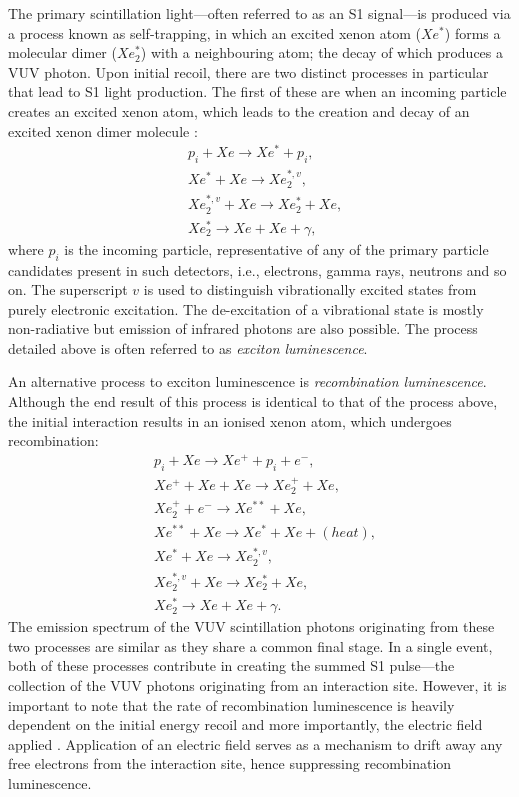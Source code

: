 The primary scintillation light---often referred to as an S1 signal---is produced via a process known as self-trapping, in which an excited xenon atom ($Xe^{\ast}$) forms a molecular dimer ($Xe^{\ast}_{2}$) with a neighbouring atom; the decay of which produces a VUV photon. Upon initial recoil, there are two distinct processes in particular that lead to S1 light production. The first of these are when an incoming particle creates an excited xenon atom, which leads to the creation and decay of an excited xenon dimer molecule \cite{xenon_physics}:
%
\begin{align} \label{eq:exciton_luminescence}
    &p_{i} + Xe \rightarrow Xe^{\ast} + p_{i}, \\
    &Xe^{\ast} + Xe \rightarrow Xe^{\ast, v}_{2}, \\
    &Xe^{\ast, v}_{2} + Xe \rightarrow Xe^{\ast}_{2} + Xe, \\
    &Xe^{\ast}_{2} \rightarrow  Xe +  Xe + \gamma,
\end{align}
%
where $p_{i}$ is the incoming particle, representative of any of the primary particle candidates present in such detectors, i.e., electrons, gamma rays, neutrons and so on. The superscript $v$ is used to distinguish vibrationally excited states from purely electronic excitation. The de-excitation of a vibrational state is mostly non-radiative but emission of infrared photons are also possible. The process detailed above is often referred to as \textit{exciton luminescence}.

An alternative process to exciton luminescence is \textit{recombination luminescence}. Although the end result of this process is identical to that of the process above, the initial interaction results in an ionised xenon atom, which undergoes recombination:
%
\begin{align} \label{eq:recombination_luminescence}
    &p_{i} + Xe \rightarrow Xe^{+} + p_{i} + e^{-}, \\
    &Xe^{+} + Xe + Xe \rightarrow Xe^{+}_{2} + Xe, \\
    &Xe^{+}_{2} + e^{-} \rightarrow Xe^{\ast\ast} + Xe, \\
    &Xe^{\ast\ast} + Xe \rightarrow Xe^{\ast} + Xe + (heat), \\
    &Xe^{\ast} + Xe \rightarrow Xe^{\ast, v}_{2}, \\
    &Xe^{\ast, v}_{2} + Xe \rightarrow Xe^{\ast}_{2} + Xe, \\
    &Xe^{\ast}_{2} \rightarrow  Xe +  Xe + \gamma.
\end{align}
%
The emission spectrum of the VUV scintillation photons originating from these two processes are similar as they share a common final stage. In a single event, both of these processes contribute in creating the summed S1 pulse---the collection of the VUV photons originating from an interaction site. However, it is important to note that the rate of recombination luminescence is heavily dependent on the initial energy recoil and more importantly, the electric field applied \cite{Dahl}. Application of an electric field serves as a mechanism to drift away any free electrons from the interaction site, hence suppressing recombination luminescence. 

